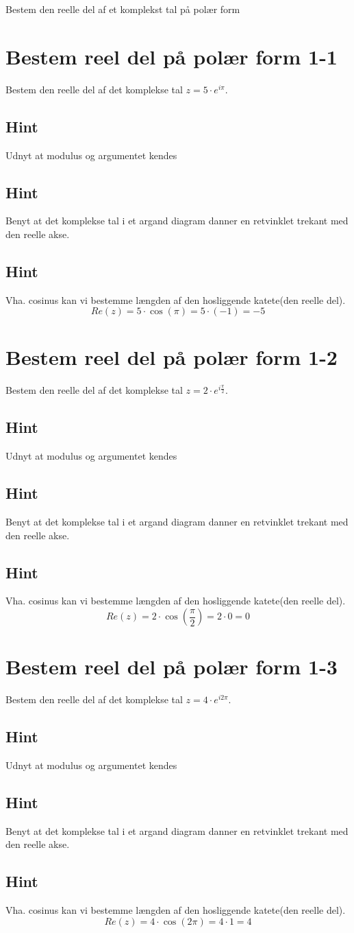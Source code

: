 \documentclass{article}
\newenvironment{exercise}[1]{\newpage\section{#1}}{}
\newcommand{\answerbox}[1]{\fbox{$#1$}}
\newcommand{\hint}{\subsection*{Hint}}
\begin{document}
Bestem den reelle del af et komplekst tal på polær form
\tableofcontents
\newpage

\begin{exercise}{Bestem reel del på polær form 1-1}

Bestem den reelle del af det komplekse tal $z=5 \cdot e^{i \pi}$.

\answerbox{-5}


\hint 

Udnyt at modulus og argumentet kendes


\hint

Benyt at det komplekse tal i et argand diagram danner en retvinklet trekant med den reelle akse. 

\hint 

Vha. cosinus kan vi bestemme længden af den hosliggende katete(den reelle del).
\[
Re(z) =  5 \cdot \cos(\pi) = 5 \cdot (-1) = -5 
\]

\end{exercise}

\newpage

\begin{exercise}{Bestem reel del på polær form 1-2}
	
	Bestem den reelle del af det komplekse tal $z=2 \cdot e^{i \frac{\pi}{2}}$.
	
	\answerbox{0}
	
	
	\hint 
	
	Udnyt at modulus og argumentet kendes
	
	
	\hint
	
	Benyt at det komplekse tal i et argand diagram danner en retvinklet trekant med den reelle akse. 
	
	\hint 
	
	Vha. cosinus kan vi bestemme længden af den hosliggende katete(den reelle del).
	\[
	Re(z) =  2 \cdot \cos\left(\frac{\pi}{2}\right) = 2 \cdot 0 = 0
	\]
	
\end{exercise}

\newpage

\begin{exercise}{Bestem reel del på polær form 1-3}
	
	Bestem den reelle del af det komplekse tal $z=4 \cdot e^{i 2\pi}$.
	
	\answerbox{4}
	
	
	\hint 
	
	Udnyt at modulus og argumentet kendes
	
	
	\hint
	
	Benyt at det komplekse tal i et argand diagram danner en retvinklet trekant med den reelle akse. 
	
	\hint 
	
	Vha. cosinus kan vi bestemme længden af den hosliggende katete(den reelle del).
	\[
	Re(z) =  4 \cdot \cos(2\pi) = 4 \cdot 1 = 4
	\]
	
\end{exercise}
\end{document}
